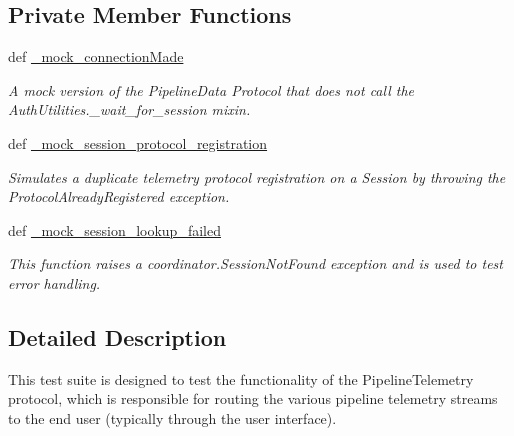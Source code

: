 \subsection*{Private Member Functions}
\begin{DoxyCompactItemize}
\item 
def \hyperlink{classhwm_1_1network_1_1protocols_1_1tests_1_1test__telemetry__protocol_1_1_test_pipeline_telemetry_protocol_a40c8764cf87719c21e2906b59dfcd78a}{\-\_\-mock\-\_\-connection\-Made}
\begin{DoxyCompactList}\small\item\em A mock version of the Pipeline\-Data Protocol that does not call the Auth\-Utilities.\-\_\-wait\-\_\-for\-\_\-session mixin. \end{DoxyCompactList}\item 
def \hyperlink{classhwm_1_1network_1_1protocols_1_1tests_1_1test__telemetry__protocol_1_1_test_pipeline_telemetry_protocol_a97c3ce828070de6295cddaf03afb18fc}{\-\_\-mock\-\_\-session\-\_\-protocol\-\_\-registration}
\begin{DoxyCompactList}\small\item\em Simulates a duplicate telemetry protocol registration on a Session by throwing the Protocol\-Already\-Registered exception. \end{DoxyCompactList}\item 
\hypertarget{classhwm_1_1network_1_1protocols_1_1tests_1_1test__telemetry__protocol_1_1_test_pipeline_telemetry_protocol_ac3e3ad87a5c6bd2e8dc1cebb9ed7da6b}{def \hyperlink{classhwm_1_1network_1_1protocols_1_1tests_1_1test__telemetry__protocol_1_1_test_pipeline_telemetry_protocol_ac3e3ad87a5c6bd2e8dc1cebb9ed7da6b}{\-\_\-mock\-\_\-session\-\_\-lookup\-\_\-failed}}\label{classhwm_1_1network_1_1protocols_1_1tests_1_1test__telemetry__protocol_1_1_test_pipeline_telemetry_protocol_ac3e3ad87a5c6bd2e8dc1cebb9ed7da6b}

\begin{DoxyCompactList}\small\item\em This function raises a coordinator.\-Session\-Not\-Found exception and is used to test error handling. \end{DoxyCompactList}\end{DoxyCompactItemize}


\subsection{Detailed Description}
This test suite is designed to test the functionality of the Pipeline\-Telemetry protocol, which is responsible for routing the various pipeline telemetry streams to the end user (typically through the user interface). 

